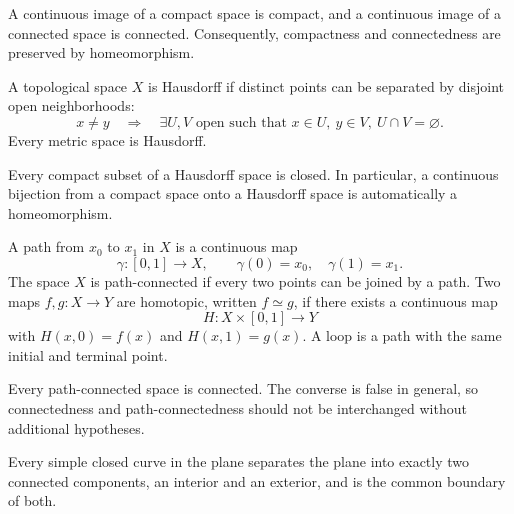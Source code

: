     \begin{theorem}
        A continuous image of a compact space is compact, and a continuous
        image of a connected space is connected. Consequently, compactness and
        connectedness are preserved by homeomorphism.
    \end{theorem}

    \begin{definition}
        A topological space $X$ is Hausdorff if distinct points can be separated
        by disjoint open neighborhoods:
        \[
            x\neq y
            \quad\Longrightarrow\quad
            \exists U,V\text{ open such that }x\in U,\ y\in V,\ U\cap V=\varnothing.
        \]
        Every metric space is Hausdorff.
    \end{definition}

    \begin{theorem}
        Every compact subset of a Hausdorff space is closed. In particular, a
        continuous bijection from a compact space onto a Hausdorff space is
        automatically a homeomorphism.
    \end{theorem}

    \begin{definition}
        A path from $x_0$ to $x_1$ in $X$ is a continuous map
        \[
            \gamma\colon [0,1]\to X,
            \qquad
            \gamma(0)=x_0,
            \quad
            \gamma(1)=x_1.
        \]
        The space $X$ is path-connected if every two points can be joined by a
        path. Two maps $f,g\colon X\to Y$ are homotopic, written $f\simeq g$, if
        there exists a continuous map
        \[
            H\colon X\times[0,1]\to Y
        \]
        with $H(x,0)=f(x)$ and $H(x,1)=g(x)$. A loop is a path with the same
        initial and terminal point.
    \end{definition}

    \begin{theorem}
        Every path-connected space is connected. The converse is false in
        general, so connectedness and path-connectedness should not be
        interchanged without additional hypotheses.
    \end{theorem}

    \begin{theorem}
        Every simple closed curve in the plane separates the plane into exactly
        two connected components, an interior and an exterior, and is the
        common boundary of both.
    \end{theorem}

